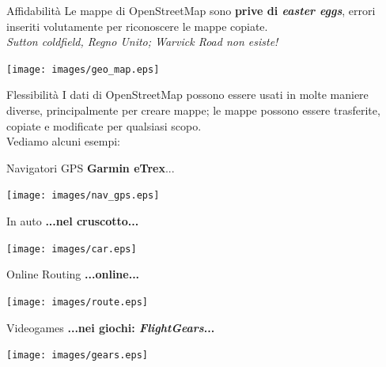 \documentclass[slidestop,compress,red,notes,xcolor=dvipsnames]{beamer}	%
\begin{document}
    \begin{frame}{Affidabilità}
        Le mappe di OpenStreetMap sono \textbf{prive di \textit{easter eggs}}, errori inseriti volutamente per riconoscere le mappe copiate.\\ \vspace{0.5cm}
        \textit{Sutton coldfield, Regno Unito; Warvick Road non esiste!}
        \begin{center}
            \texttt{[image: images/geo\_map.eps]}
        \end{center}
    \end{frame}

    \begin{frame}{Flessibilità}
        I dati di OpenStreetMap possono essere usati in molte maniere diverse, principalmente per creare mappe; le mappe possono essere trasferite, copiate e modificate per qualsiasi scopo.\\ Vediamo alcuni esempi:
    \end{frame}

    \begin{frame}{Navigatori GPS}
        \textbf{Garmin eTrex}...\\
        \begin{center}
            \texttt{[image: images/nav\_gps.eps]}
        \end{center}
    \end{frame}

    \begin{frame}{In auto}
        \textbf{...nel cruscotto...}\\
        \begin{center}
            \texttt{[image: images/car.eps]}
        \end{center}
    \end{frame}

    \begin{frame}{Online Routing}
        \textbf{...online...}
        \begin{center}
            \texttt{[image: images/route.eps]}
        \end{center}
    \end{frame}

    \begin{frame}{Videogames}
        \textbf{...nei giochi: \textit{FlightGears}...}
        \begin{center}
            \texttt{[image: images/gears.eps]}
        \end{center}
    \end{frame}
\end{document}
